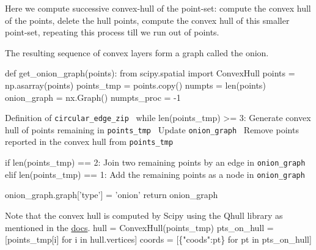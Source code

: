 Here we compute successive convex-hull of the point-set: compute the convex hull of the points, delete the hull points, 
compute the convex hull of this smaller point-set, repeating this process till we run out of points. 

The resulting sequence of convex layers form a graph called the onion. 

\nwenddocs{}\plusendmoddef\nwstartdeflinemarkup{}\nwenddeflinemarkup

def get_onion_graph(points):
     from scipy.spatial import ConvexHull
     points      = np.asarray(points)     
     points_tmp  = points.copy()
     numpts      = len(points)
     onion_graph = nx.Graph()
     numpts_proc = -1

     \LA{} Definition of \verb|circular_edge_zip|~{\nwtagstyle{}}\RA{}
     while len(points_tmp) >= 3:
           \LA{}Generate convex hull of points remaining in \verb|points_tmp|~{\nwtagstyle{}}\RA{}
           \LA{}Update \verb|onion_graph|~{\nwtagstyle{}}\RA{}
           \LA{}Remove points reported in the convex hull from \verb|points_tmp|~{\nwtagstyle{}}\RA{}

     if len(points_tmp) == 2:
          \LA{}Join two remaining points by an edge in \verb|onion_graph|~{\nwtagstyle{}}\RA{}
     elif len(points_tmp) == 1:
          \LA{}Add the remaining points as a node in \verb|onion_graph|~{\nwtagstyle{}}\RA{}
 
     onion_graph.graph['type'] = 'onion'
     return onion_graph
\nwendcode{}\nwdocspar


Note that the convex hull is computed by Scipy using the Qhull library as mentioned in the \href{https://docs.scipy.org/doc/scipy/reference/generated/scipy.spatial.ConvexHull.html}{docs}. 
\nwenddocs{}\endmoddef\nwstartdeflinemarkup{}\nwenddeflinemarkup
hull            = ConvexHull(points_tmp)
pts_on_hull     = [points_tmp[i] for i in hull.vertices]
coords          = [\{"coods":pt\} for pt in pts_on_hull]
\nwendcode{}\nwdocspar


